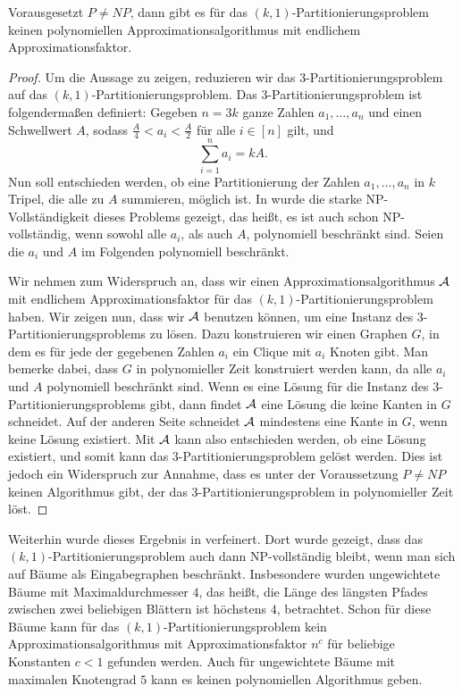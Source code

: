 \begin{thm}\label{thm:np_comp}
    Vorausgesetzt $P \neq NP$, dann gibt es für das $(k,1)$\hyp Partitionierungsproblem keinen polynomiellen Approximationsalgorithmus mit endlichem Approximationsfaktor.
\end{thm}
\begin{proof}
    Um die Aussage zu zeigen, reduzieren wir das $3$\hyp Partitionierungsproblem auf das $(k,1)$\hyp Partitionierungsproblem. 
    Das $3$\hyp Partitionierungsproblem ist folgendermaßen definiert: Gegeben $n = 3k$ ganze Zahlen $a_1,\ldots, a_n$ und einen Schwellwert $A$, sodass $\frac{A}{4} < a_i < \frac{A}{2}$ für alle $i \in [n]$ gilt, und 
    \begin{equation*}
        \sum_{i=1}^{n} a_i = kA.
    \end{equation*}
    Nun soll entschieden werden, ob eine Partitionierung der Zahlen $a_1, \ldots, a_n$ in $k$ Tripel, die alle zu $A$ summieren, möglich ist. 
    In \parencite{gj79} wurde die starke NP-Vollständigkeit dieses Problems gezeigt, das heißt, es ist auch schon NP-vollständig, wenn sowohl alle $a_i$, als auch $A$, polynomiell beschränkt sind.
    Seien die $a_i$ und $A$ im Folgenden polynomiell beschränkt.

    \noindent Wir nehmen zum Widerspruch an, dass wir einen Approximationsalgorithmus $\mathcal{A}$ mit endlichem Approximationsfaktor für das $(k,1)$\hyp Partitionierungsproblem haben. 
    Wir zeigen nun, dass wir $\mathcal{A}$ benutzen können, um eine Instanz des $3$\hyp Partitionierungsproblems zu lösen.
    Dazu konstruieren wir einen Graphen $G$, in dem es für jede der gegebenen Zahlen $a_i$ ein Clique mit $a_i$ Knoten gibt.
	Man bemerke dabei, dass $G$ in polynomieller Zeit konstruiert werden kann, da alle $a_i$ und $A$ polynomiell beschränkt sind.
    Wenn es eine Lösung für die Instanz des $3$\hyp Partitionierungsproblems gibt, dann findet $\mathcal{A}$ eine Lösung die keine Kanten in $G$ schneidet. 
    Auf der anderen Seite schneidet $\mathcal{A}$ mindestens eine Kante in $G$, wenn keine Lösung existiert.
    Mit $\mathcal{A}$ kann also entschieden werden, ob eine Lösung existiert, und somit kann das $3$\hyp Partitionierungsproblem gelöst werden.
    Dies ist jedoch ein Widerspruch zur Annahme, dass es unter der Voraussetzung $P \neq NP$ keinen Algorithmus gibt, der das $3$\hyp Partitionierungsproblem in polynomieller Zeit löst.
\end{proof}

Weiterhin wurde dieses Ergebnis in \parencite{ff13} verfeinert. 
Dort wurde gezeigt, dass das $(k,1)$\hyp Partitionierungsproblem auch dann NP-vollständig bleibt, wenn man sich auf Bäume als Eingabegraphen beschränkt.
Insbesondere wurden ungewichtete Bäume mit Maximaldurchmesser $4$, das heißt, die Länge des längsten Pfades zwischen zwei beliebigen Blättern ist höchstens $4$, betrachtet.
Schon für diese Bäume kann für das $(k,1)$\hyp Partitionierungsproblem kein Approximationsalgorithmus mit Approximationsfaktor $n^c$ für beliebige Konstanten $c < 1$ gefunden werden.
Auch für ungewichtete Bäume mit maximalen Knotengrad $5$ kann es keinen polynomiellen Algorithmus geben.

